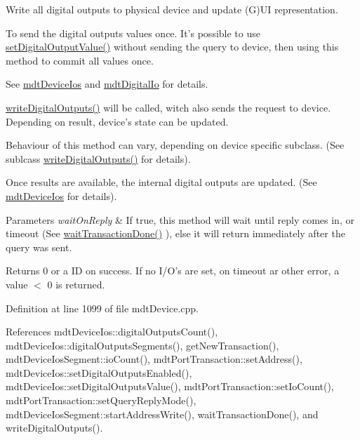 Write all digital outputs to physical device and update (G)U\-I representation. 

To send the digital outputs values once. It's possible to use \hyperlink{classmdt_device_a04564fd9be440c026e7c399f0e619485}{set\-Digital\-Output\-Value()} without sending the query to device, then using this method to commit all values once.

See \hyperlink{classmdt_device_ios}{mdt\-Device\-Ios} and \hyperlink{classmdt_digital_io}{mdt\-Digital\-Io} for details.

\hyperlink{classmdt_device_ae644ab1ef0ebb57d6d9d502829907ec1}{write\-Digital\-Outputs()} will be called, witch also sends the request to device. Depending on result, device's state can be updated.

Behaviour of this method can vary, depending on device specific subclass. (See sublcass \hyperlink{classmdt_device_ae644ab1ef0ebb57d6d9d502829907ec1}{write\-Digital\-Outputs()} for details).

Once results are available, the internal digital outputs are updated. (See \hyperlink{classmdt_device_ios}{mdt\-Device\-Ios} for details).


\begin{DoxyParams}{Parameters}
{\em wait\-On\-Reply} & If true, this method will wait until reply comes in, or timeout (See \hyperlink{classmdt_device_ab937015c1a319b7234442a4cc29a02a8}{wait\-Transaction\-Done()} ), else it will return immediately after the query was sent. \\
\hline
\end{DoxyParams}
\begin{DoxyReturn}{Returns}
0 or a I\-D on success. If no I/\-O's are set, on timeout ar other error, a value $<$ 0 is returned. 
\end{DoxyReturn}


Definition at line 1099 of file mdt\-Device.\-cpp.



References mdt\-Device\-Ios\-::digital\-Outputs\-Count(), mdt\-Device\-Ios\-::digital\-Outputs\-Segments(), get\-New\-Transaction(), mdt\-Device\-Ios\-Segment\-::io\-Count(), mdt\-Port\-Transaction\-::set\-Address(), mdt\-Device\-Ios\-::set\-Digital\-Outputs\-Enabled(), mdt\-Device\-Ios\-::set\-Digital\-Outputs\-Value(), mdt\-Port\-Transaction\-::set\-Io\-Count(), mdt\-Port\-Transaction\-::set\-Query\-Reply\-Mode(), mdt\-Device\-Ios\-Segment\-::start\-Address\-Write(), wait\-Transaction\-Done(), and write\-Digital\-Outputs().

